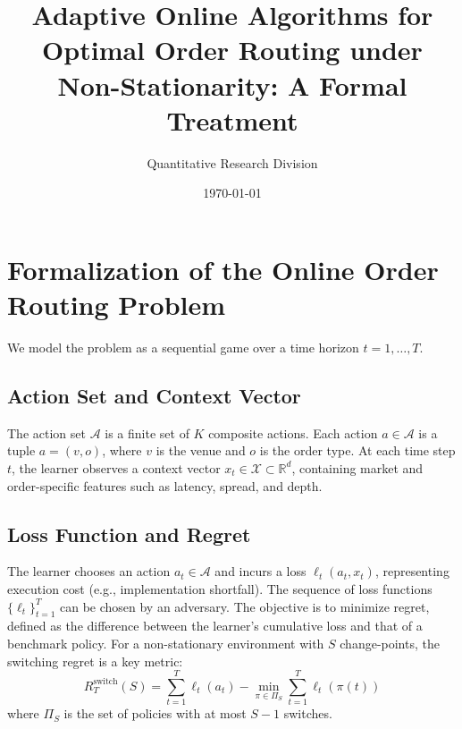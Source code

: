 \documentclass{article}
\title{Adaptive Online Algorithms for Optimal Order Routing under Non-Stationarity: A Formal Treatment}
\author{Quantitative Research Division}
\date{\today}
\begin{document}
\maketitle


\section{Formalization of the Online Order Routing Problem}
We model the problem as a sequential game over a time horizon $t=1, \dots, T$.

\subsection{Action Set and Context Vector}
The action set $\mathcal{A}$ is a finite set of $K$ composite actions. Each action $a \in \mathcal{A}$ is a tuple $a = (v, o)$, where $v$ is the venue and $o$ is the order type. At each time step $t$, the learner observes a context vector $x_t \in \mathcal{X} \subset \mathbb{R}^d$, containing market and order-specific features such as latency, spread, and depth.

\subsection{Loss Function and Regret}
The learner chooses an action $a_t \in \mathcal{A}$ and incurs a loss $\ell_t(a_t, x_t)$, representing execution cost (e.g., implementation shortfall). The sequence of loss functions $\{\ell_t\}_{t=1}^T$ can be chosen by an adversary. The objective is to minimize regret, defined as the difference between the learner's cumulative loss and that of a benchmark policy. For a non-stationary environment with $S$ change-points, the switching regret is a key metric:
\begin{equation}
    R_T^{\text{switch}}(S) = \sum_{t=1}^T \ell_t(a_t) - \min_{\pi \in \Pi_S} \sum_{t=1}^T \ell_t(\pi(t))
\end{equation}
where $\Pi_S$ is the set of policies with at most $S-1$ switches.
\end{document}
